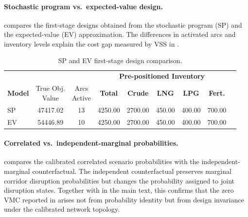 \documentclass[final,3p,authoryear]{elsarticle}
\theoremstyle{definition}
\begin{document}
\paragraph{Stochastic program vs.\ expected-value design.}
 compares the first-stage designs
obtained from the stochastic program (SP) and the expected-value (EV)
approximation. The differences in activated arcs and inventory levels
explain the cost gap measured by VSS in .

\begin{table}[ht]
\centering
\caption{SP and EV first-stage design comparison.}
\label{tab:tab02_design_comparison}
\small
\begin{tabular}{lcccccccc}
\toprule
 & & & \multicolumn{5}{c}{\textbf{Pre-positioned Inventory}} \\
 \cmidrule(lr){4-8}
\textbf{Model} & \thead{True Obj.\\Value} & \thead{Arcs\\Active} & \textbf{Total} & \textbf{Crude} & \textbf{LNG} & \textbf{LPG} & \textbf{Fert.} \\
\midrule
SP & 47417.02 & 13 & 4250.00 & 2700.00 & 450.00 & 400.00 & 700.00 \\
EV & 54446.89 & 10 & 4250.00 & 2700.00 & 450.00 & 400.00 & 700.00 \\
\bottomrule
\end{tabular}
\end{table}

\paragraph{Correlated vs.\ independent-marginal probabilities.}
 compares the calibrated
correlated scenario probabilities with the independent-marginal
counterfactual. The independent counterfactual preserves marginal
corridor disruption probabilities but changes the probability assigned
to joint disruption states. Together with  in the
main text, this confirms that the zero VMC reported in 
arises not from probability identity but from design invariance under
the calibrated network topology.
\end{document}
